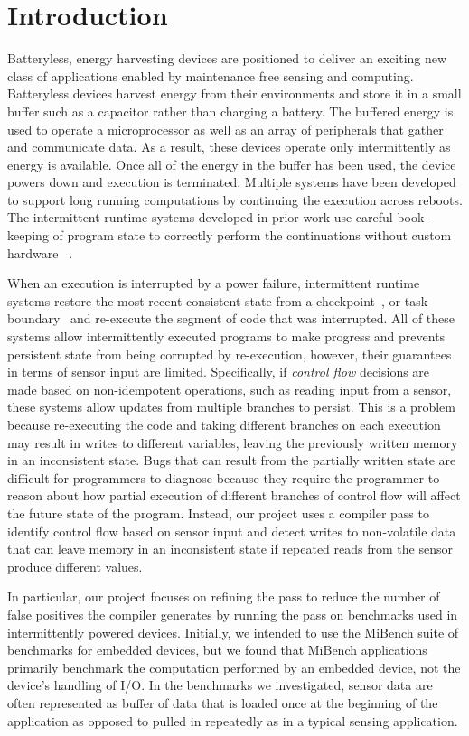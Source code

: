 \section{Introduction}

Batteryless, energy harvesting devices are positioned to deliver an exciting new
class of applications enabled by maintenance free sensing and computing.
Batteryless devices harvest energy from their environments and store it in a
small buffer such as a capacitor rather than charging a battery.  The buffered
energy is used to operate a microprocessor as well as an array of peripherals
that gather and communicate data. As a result, these devices operate only
intermittently as energy is available.
%
Once all of the energy in the buffer has been used, the device powers down and
execution is terminated. Multiple systems have been developed to support long
running computations by continuing the execution across reboots. The
intermittent runtime systems developed in prior work use careful book-keeping of
program state to correctly perform the continuations  without custom hardware
~\cite{chain,dino,mementos,alpaca,mayfly,ratchet}.

When an execution is interrupted by a power failure, intermittent runtime
systems restore the most recent consistent state from a
checkpoint~\cite{mementos,ratchet}, or task boundary~\cite{chain,alpaca,dino} and
re-execute the segment of code that was interrupted.
%
All of these systems allow intermittently executed programs to make progress and
prevents persistent state from being corrupted by re-execution, however, their
guarantees in terms of sensor input are limited. Specifically, if \emph{control
flow} decisions are made based on non-idempotent operations, such as reading
input from a sensor, these systems allow updates from multiple branches to
persist.
%
This is a problem because re-executing the code and taking different branches on
each execution may result in writes to different variables, leaving the
previously written memory in an inconsistent state.
%
Bugs that can result from the partially written state are difficult for
programmers to diagnose because they require the programmer to reason about how
partial execution of different branches of control flow will affect the future
state of the program.
%
Instead, our project uses a compiler pass to identify control flow based on sensor input
and detect writes to non-volatile data that can leave memory in an inconsistent
state if repeated reads from the sensor produce different values.
%

In particular, our project focuses on refining the pass to
reduce the number of false positives the compiler generates by running the pass
on benchmarks used in intermittently powered devices. Initially, we intended to
use the MiBench suite of benchmarks for embedded devices, but we found that
MiBench applications primarily benchmark the computation performed by an
embedded device, not the device's handling of I/O. In the benchmarks we
investigated, sensor data are often represented as buffer of data that is
loaded once at the beginning of the application as opposed to pulled in
repeatedly as in a typical sensing application.


